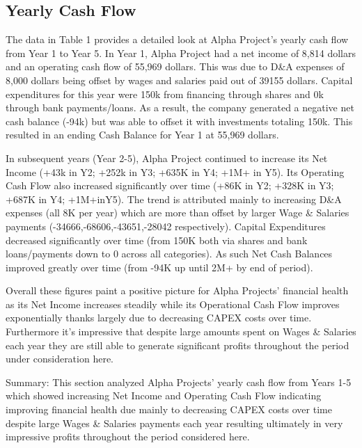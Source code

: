 

\subsection{Yearly Cash Flow}\label{sec:title}

The data in Table 1 provides a detailed look at Alpha Project's yearly cash flow from Year 1 to Year 5. In Year 1, Alpha Project had a net income of 8,814 dollars and an operating cash flow of 55,969 dollars. This was due to D&A expenses of 8,000 dollars being offset by wages and salaries paid out of 39155 dollars. Capital expenditures for this year were 150k from financing through shares and 0k through bank payments/loans. As a result, the company generated a negative net cash balance (-94k) but was able to offset it with investments totaling 150k. This resulted in an ending Cash Balance for Year 1 at 55,969 dollars. 

In subsequent years (Year 2-5), Alpha Project continued to increase its Net Income (+43k in Y2; +252k in Y3; +635K in Y4; +1M+ in Y5). Its Operating Cash Flow also increased significantly over time (+86K in Y2; +328K in Y3; +687K in Y4; +1M+inY5). The trend is attributed mainly to increasing D&A expenses (all 8K per year) which are more than offset by larger Wage & Salaries payments (-34666,-68606,-43651,-28042 respectively). Capital Expenditures decreased significantly over time (from 150K both via shares and bank loans/payments down to 0 across all categories). As such Net Cash Balances improved greatly over time (from -94K up until 2M+ by end of period). 

Overall these figures paint a positive picture for Alpha Projects' financial health as its Net Income increases steadily while its Operational Cash Flow improves exponentially thanks largely due to decreasing CAPEX costs over time. Furthermore it's impressive that despite large amounts spent on Wages & Salaries each year they are still able to generate significant profits throughout the period under consideration here. 

Summary: This section analyzed Alpha Projects' yearly cash flow from Years 1-5 which showed increasing Net Income and Operating Cash Flow indicating improving financial health due mainly to decreasing CAPEX costs over time despite large Wages & Salaries payments each year resulting ultimately in very impressive profits throughout the period considered here.